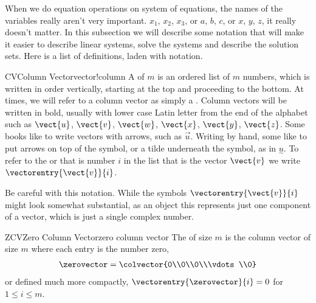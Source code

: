 %
%
When we do equation operations on system of equations, the names of the variables really aren't very important.  $x_1$, $x_2$, $x_3$, or $a$, $b$, $c$, or $x$, $y$, $z$, it really doesn't matter.  In this subsection we will describe some notation that will make it easier to describe linear systems, solve the systems and describe the solution sets.  Here is a list of definitions, laden with notation.\par
%
\begin{definition}{CV}{Column Vector}{vector!column}
A  of  $m$ is an ordered list of $m$ numbers, which is written in order vertically, starting at the top and proceeding to the bottom.  At times, we will refer to a column vector as simply a .  Column vectors will be written in bold, usually with lower case Latin letter from the end of the alphabet such as $\vect{u}$, $\vect{v}$, $\vect{w}$, $\vect{x}$, $\vect{y}$, $\vect{z}$.  Some books like to write vectors with arrows, such as $\vec{u}$.  Writing by hand, some like to put arrows on top of the symbol, or a tilde underneath the symbol, as in $\underset{\sim}{\textstyle u}$.  To refer to the  or  that is number $i$ in the list that is the vector $\vect{v}$ we write $\vectorentry{\vect{v}}{i}$.
\end{definition}
%
Be careful with this notation.  While the symbols $\vectorentry{\vect{v}}{i}$ might look somewhat substantial, as an object this represents just one component of a vector, which is just a single complex number.
%
\begin{definition}{ZCV}{Zero Column Vector}{zero column vector}
The  of size $m$ is the column vector of size $m$ where each entry is the number zero,
%
\begin{align*}
\zerovector=
\colvector{0\\0\\0\\\vdots\\0}
\end{align*}
%
or defined much more compactly, $\vectorentry{\zerovector}{i}=0$ for $1\leq i\leq m$.
\end{definition}
%
%
